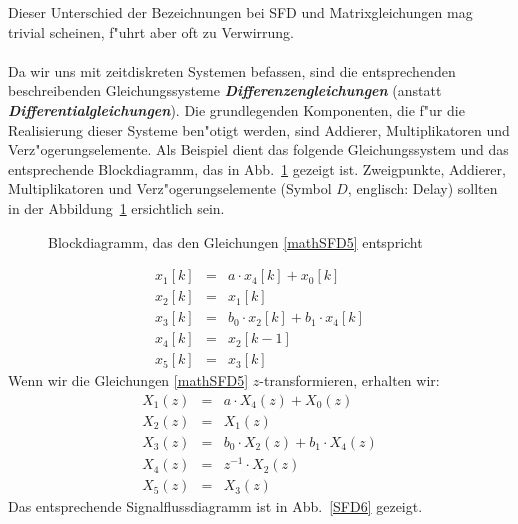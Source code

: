 \nit Dieser Unterschied der Bezeichnungen bei SFD und Matrixgleichungen mag trivial scheinen, f"uhrt aber oft zu Verwirrung.\\ ~\\ Da wir uns
mit zeitdiskreten Systemen befassen, sind die entsprechenden
beschreibenden Gleichungssysteme  {\it\textbf{Differenzengleichungen}} (anstatt
 {\it\textbf{Differentialgleichungen}}). Die grundlegenden Komponenten, die f"ur die
Realisierung dieser Systeme ben"otigt werden, sind
Addierer, Multiplikatoren und
Verz"ogerungselemente. Als Beispiel dient
das folgende Gleichungssystem und das entsprechende Blockdiagramm, das
in Abb.~\ref{SFD5} gezeigt ist. Zweigpunkte, Addierer, Multiplikatoren
und Verz"ogerungselemente  (Symbol $D$,
englisch: Delay) sollten in der Abbildung~\ref{SFD5} ersichtlich sein.\\
\begin{figure}[htb!]
\begin{center}
  \caption{Blockdiagramm, das den Gleichungen \ref{mathSFD5} entspricht}\label{SFD5}
\end{center}
\vspace*{-7mm}
\end{figure}
\begin{eqnarray}
 x_1[k] & = & a\cdot x_4[k] + x_0[k] \nonumber \\
 x_2[k] & = & x_1[k]\nonumber\\
 x_3[k] & = & b_0\cdot x_2[k] + b_1\cdot x_4[k] \label{mathSFD5}\\ 
 x_4[k] & = & x_2[k-1]\nonumber\\
 x_5[k] & = & x_3[k]\nonumber
\end{eqnarray}
\nit Wenn wir die Gleichungen \ref{mathSFD5} $z$-transformieren, erhalten
wir:
\begin{eqnarray}
 X_1(z) & = & a\cdot X_4(z) + X_0(z)\nonumber\\
 X_2(z) & = & X_1(z)\nonumber\\
 X_3(z) & = & b_0\cdot X_2(z) + b_1\cdot X_4(z) \label{mathSFD6}\\ 
 X_4(z) & = & z^{-1}\cdot X_2(z)\nonumber\\
 X_5(z) & = & X_3(z)\nonumber
\end{eqnarray}
\nit Das entsprechende Signalflussdiagramm ist in Abb.~\ref{SFD6} gezeigt.\\
